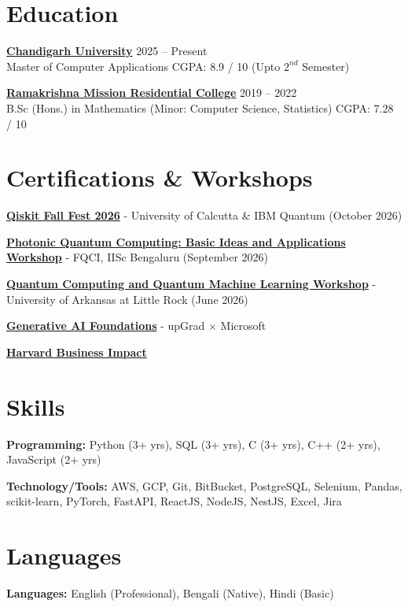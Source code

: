 \documentclass[a4paper,10pt]{article}
\begin{document}
\section*{Education}

\textbf{\href{https://www.onlinecu.in/}{Chandigarh University}} \hfill 2025 -- Present\\
Master of Computer Applications \hfill CGPA: 8.9 / 10 (Upto $2^{nd}$ Semester)

\vspace{4pt}

\textbf{\href{https://rkmrc.in/}{Ramakrishna Mission Residential College}} \hfill 2019 -- 2022\\
B.Sc (Hons.) in Mathematics (Minor: Computer Science, Statistics) \hfill CGPA: 7.28 / 10

\section*{Certifications \& Workshops}

\begin{experiencelist}
\item \textbf{\href{}{Qiskit Fall Fest 2026}} - University of Calcutta \& IBM Quantum (October 2026)
\item \textbf{\href{https://drive.google.com/file/d/1TpwsRTkzrbaOGaBvLiKQCRCqRd7SMzh-/view?usp=sharing}{Photonic Quantum Computing: Basic Ideas and Applications Workshop}} - FQCI, IISc Bengaluru (September 2026)
\item \textbf{\href{https://credentials.ualr.edu/3df1b72c-0cf2-48ec-b33f-7876c530c229}{Quantum Computing and Quantum Machine Learning Workshop}} - University of Arkansas at Little Rock (June 2026)
\item \textbf{\href{https://drive.google.com/file/d/1NLfZrSZEskW8HObsceki1vVsTLVcJf3Y/view?usp=sharing}{Generative AI Foundations}} - upGrad $\times$ Microsoft
\item \textbf{\href{https://drive.google.com/drive/folders/1dgmjOP5JkIuk5EYM-fahhpC6VY-30HEk?usp=sharing}{Harvard Business Impact}}
\end{experiencelist}

\section*{Skills}

\textbf{Programming:} Python (3+ yrs), SQL (3+ yrs), C (3+ yrs), C++ (2+ yrs), JavaScript (2+ yrs)



\textbf{Technology/Tools:} AWS, GCP, Git, BitBucket, PostgreSQL, Selenium, Pandas, scikit-learn, PyTorch, FastAPI, ReactJS, NodeJS, NestJS, Excel, Jira

\section*{Languages}

\textbf{Languages:} English (Professional), Bengali (Native), Hindi (Basic)
\end{document}
